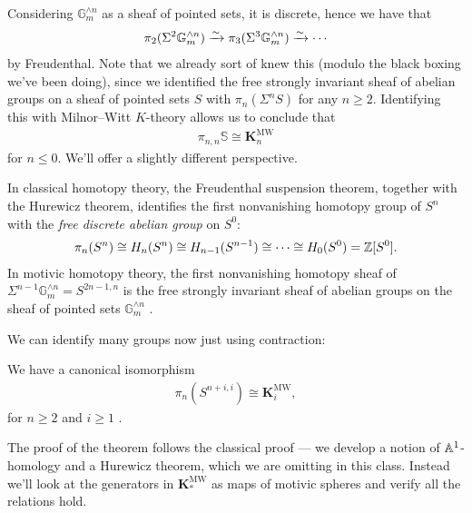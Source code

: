\documentclass[11pt,openany]{book}
\let\smashprod\wedge
\providecommand{\KMW}{\mathbf{K}^\mathrm{MW}}
\begin{document}
Considering $\mathbb{G}_m^{\smashprod n}$ as a sheaf of pointed sets, it is discrete, hence we have that
\begin{align*}
    \pi_2(\Sigma^2 \mathbb{G}_m^{\smashprod n}) \xto{\sim} \pi_3(\Sigma^3 \mathbb{G}_m^{\smashprod n}) \xto{\sim} \cdots 
\end{align*}
by Freudenthal. Note that we already sort of knew this (modulo the black boxing we've been doing), since we identified the free strongly invariant sheaf of abelian groups on a sheaf of pointed sets $S$ with $\pi_n(\Sigma^n S)$ for any $n \ge 2$. Identifying this with Milnor--Witt $K$-theory allows us to conclude that
\begin{align*}
    \pi_{n,n}\mathbb{S}\cong \KMW_n
\end{align*}
for $n\le 0$. We'll offer a slightly different perspective.

\begin{intuition} In classical homotopy theory, the Freudenthal suspension theorem, together with the Hurewicz theorem, identifies the first nonvanishing homotopy group of $S^n$ with the \textit{free discrete abelian group} on $S^0$:
\begin{align*}
    \pi_n(S^n) \cong H_n(S^n) \cong H_{n-1}(S^{n-1}) \cong \cdots \cong H_0(S^0) = \mathbb{Z}[S^0].
\end{align*}
In motivic homotopy theory, the first nonvanishing homotopy sheaf of $\Sigma^{n-1} \mathbb{G}_m^{\smashprod n} = S^{2n-1,n}$ is the free strongly invariant sheaf of abelian groups on the sheaf of pointed sets $\mathbb{G}_m^{\smashprod n}$ \cite[1.23]{Morel}.
\end{intuition}

We can identify many groups now just using contraction:

\begin{corollary} We have a canonical isomorphism
\label{cor:pi_n_Sph_KMW}
\begin{align*}
    \pi_n \left( S^{n+i,i} \right) \cong \KMW_i,
\end{align*}
for $n\ge 2$ and $i\ge 1$ \cite[p.~167]{Morel}.
\end{corollary}

The proof of the theorem follows the classical proof --- we develop a notion of $\mathbb{A}^1$-homology and a Hurewicz theorem, which we are omitting in this class. Instead we'll look at the generators in $\KMW_\ast$ as maps of motivic spheres and verify all the relations hold.
\end{document}
